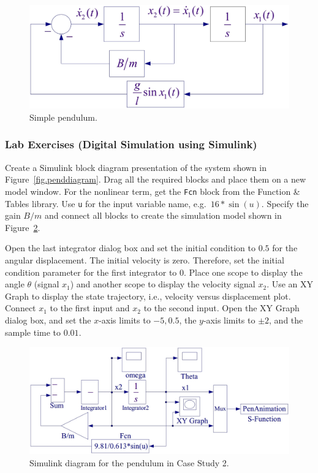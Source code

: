 \begin{figure}[thb]
\centering
\includegraphics[width=.6\textwidth]{PendSysDiagram}
\caption{\footnotesize
        Simple pendulum.
        \label{fig.pendstatediagram}
        }
\end{figure}

\subsubsection{Lab Exercises (Digital Simulation using Simulink)}

Create a Simulink block diagram presentation of the system shown in Figure~\ref{fig.penddiagram}.  Drag all the required blocks and place them on a new model window.  For the nonlinear term, get the \texttt{Fcn} block from the Function \& Tables library.  Use \texttt{u} for the input variable name, e.g.\ $16*\sin(u)$.  Specify the gain $B/m$ and connect all blocks to create the simulation model shown in Figure~\ref{fig.pendsimulink}.
\par
Open the last integrator dialog box and set the initial condition to $0.5$ for the angular displacement.  The initial velocity is zero.  Therefore, set the initial condition parameter for the first integrator to 0.  Place one scope to display the angle $\theta$ (signal $x_1$) and another scope to display the velocity signal $x_2$. Use an XY Graph to display the state trajectory, i.e., velocity versus displacement plot.  Connect $x_1$ to the first input and $x_2$ to the second input.  Open the XY Graph dialog box, and set the $x$-axis limits to $-5,0.5$, the $y$-axis limits to $\pm2$, and the sample time to $0.01$.

\begin{figure}[thb]
\centering
\includegraphics[width=.9\textwidth]{PendSimulink}
\caption{\footnotesize
        Simulink diagram for the pendulum in Case Study 2.
        \label{fig.pendsimulink}
        }
\end{figure}

